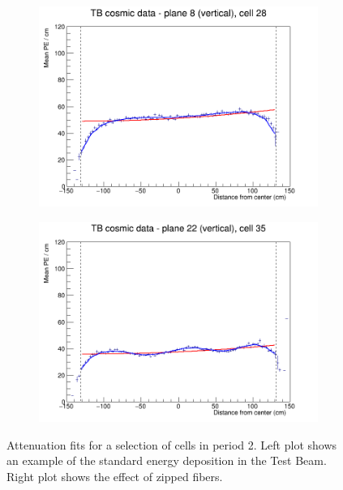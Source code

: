 \documentclass[12pt,a4paper]{article}
\begin{document}
\begin{figure}[h]
  \begin{subfigure}{0.5\textwidth}
    \includegraphics[width=\linewidth]{RelativeCalibrationResults/p2_008_028.png}
  \end{subfigure}
  \begin{subfigure}{0.5\textwidth}
    \includegraphics[width=\linewidth]{RelativeCalibrationResults/p2_022_035.png}
  \end{subfigure}
  \caption{Attenuation fits for a selection of cells in period 2. Left plot shows an example of the standard energy deposition in the Test Beam. Right plot shows the effect of zipped fibers.}
  \label{figAttenfitResultsPerio2_ZippedFibers}
\end{figure}
\end{document}
